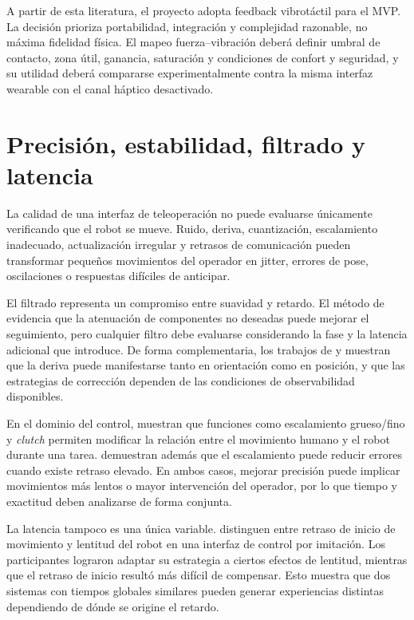 A partir de esta literatura, el proyecto adopta feedback vibrotáctil para el MVP. La decisión prioriza portabilidad, integración y complejidad razonable, no máxima fidelidad física. El mapeo fuerza--vibración deberá definir umbral de contacto, zona útil, ganancia, saturación y condiciones de confort y seguridad, y su utilidad deberá compararse experimentalmente contra la misma interfaz wearable con el canal háptico desactivado.

\section{Precisión, estabilidad, filtrado y latencia}

La calidad de una interfaz de teleoperación no puede evaluarse únicamente verificando que el robot se mueve. Ruido, deriva, cuantización, escalamiento inadecuado, actualización irregular y retrasos de comunicación pueden transformar pequeños movimientos del operador en jitter, errores de pose, oscilaciones o respuestas difíciles de anticipar.

El filtrado representa un compromiso entre suavidad y retardo. El método de \textcite{zhu2022tremor} evidencia que la atenuación de componentes no deseadas puede mejorar el seguimiento, pero cualquier filtro debe evaluarse considerando la fase y la latencia adicional que introduce. De forma complementaria, los trabajos de \textcite{wittmann2019drift} y \textcite{bai2023deadreckoning} muestran que la deriva puede manifestarse tanto en orientación como en posición, y que las estrategias de corrección dependen de las condiciones de observabilidad disponibles.

En el dominio del control, \textcite{zhang2019gesture} muestran que funciones como escalamiento grueso/fino y \textit{clutch} permiten modificar la relación entre el movimiento humano y el robot durante una tarea. \textcite{richter2019scaling} demuestran además que el escalamiento puede reducir errores cuando existe retraso elevado. En ambos casos, mejorar precisión puede implicar movimientos más lentos o mayor intervención del operador, por lo que tiempo y exactitud deben analizarse de forma conjunta.

La latencia tampoco es una única variable. \textcite{rakita2020latency} distinguen entre retraso de inicio de movimiento y lentitud del robot en una interfaz de control por imitación. Los participantes lograron adaptar su estrategia a ciertos efectos de lentitud, mientras que el retraso de inicio resultó más difícil de compensar. Esto muestra que dos sistemas con tiempos globales similares pueden generar experiencias distintas dependiendo de dónde se origine el retardo.

